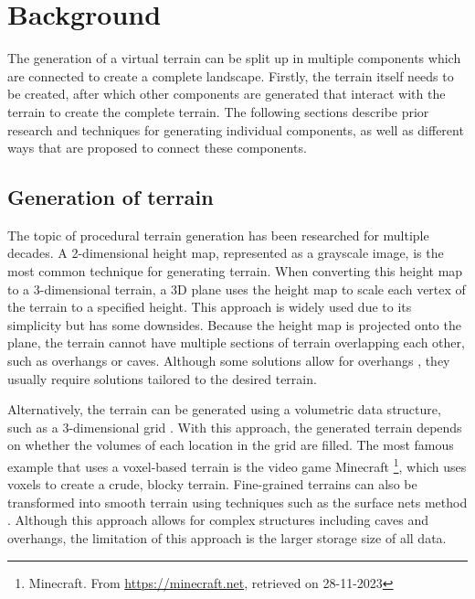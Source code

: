 \documentclass{article}
\begin{document}


\section{Background}
The generation of a virtual terrain can be split up in multiple components which are connected to create a complete landscape. Firstly, the terrain itself needs to be created, after which other components are generated that interact with the terrain to create the complete terrain. The following sections describe prior research and techniques for generating individual components, as well as different ways that are proposed to connect these components.

\subsection{Generation of terrain}
The topic of procedural terrain generation has been researched for multiple decades. A 2-dimensional height map, represented as a grayscale image, is the most common technique for generating terrain. When converting this height map to a 3-dimensional terrain, a 3D plane uses the height map to scale each vertex of the terrain to a specified height. This approach is widely used due to its simplicity but has some downsides. Because the height map is projected onto the plane, the terrain cannot have multiple sections of terrain overlapping each other, such as overhangs or caves. Although some solutions allow for overhangs \cite{gamito_procedural_2003}, they usually require solutions tailored to the desired terrain.

Alternatively, the terrain can be generated using a volumetric data structure, such as a 3-dimensional grid \cite{dey_procedural_2018}. With this approach, the generated terrain depends on whether the volumes of each location in the grid are filled. The most famous example that uses a voxel-based terrain is the video game Minecraft \footnote{Minecraft. From \url{https://minecraft.net}, retrieved on 28-11-2023}, which uses voxels to create a crude, blocky terrain. Fine-grained terrains can also be transformed into smooth terrain using techniques such as the surface nets method \cite{gibson_constrained_1998}. Although this approach allows for complex structures including caves \cite{cui_voxel-based_2011} and overhangs, the limitation of this approach is the larger storage size of all data.
\end{document}
